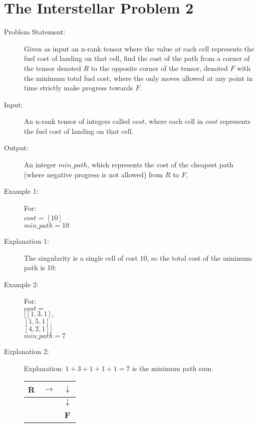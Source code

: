 \section{The Interstellar Problem 2}
\begin{description}
    \item[Problem Statement:]
    Given as input an n-rank tensor where the value at each cell represents the fuel cost of landing on that cell, find the cost of the path from a corner of the tensor denoted $R$ to the opposite corner of the tensor,
    denoted $F$ with the minimum total fuel cost, where the only moves allowed at any point in time strictly make progress towards $F$.
        
    \item[Input:]
    An n-rank tensor of integers called $cost$, where each cell in $cost$ represents the fuel cost of landing on that cell.
        
    \item[Output:] 
    An integer $min\_path$, which represents the cost of the cheapest path (where negative progress is not allowed) from $R$ to $F$.
        
    \item[Example 1:] For:\\
    $cost$ = $[10]$\\
    $min\_path = 10$
    \item[Explanation 1:]
    The singularity is a single cell of cost 10, so the total cost of the minimum path is 10:

    \item[Example 2:] For:\\
    $cost = $\\
    $[[1,3,1],$\\
    $[1,5,1],$\\
    $[4,2,1]]$\\
    $min\_path = 7$

    \item[Explanation 2:]
        Explanation: $1 + 3 + 1 + 1 + 1 = 7$ is the minimum path sum.
        \begin{table}[H]
            \centering
            \begin{tabular}{|c|c|c|}
                \hline
                \textbf{R} & $\rightarrow$ & $\downarrow$ \\
                \hline
                 &  & $\downarrow$ \\
                \hline
                 &  & \textbf{F} \\
                \hline
            \end{tabular}
        \end{table}
\end{description}

